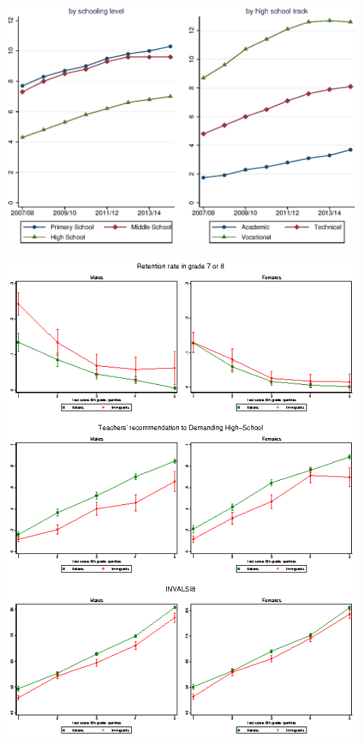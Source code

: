 \documentclass[12pt]{article}
\begin{document}
\includegraphics[scale=1.2]{immigrants_in_education_f.eps}

\includegraphics[scale=1.9]{Figure_segregation_other_f.eps}
\end{document}

